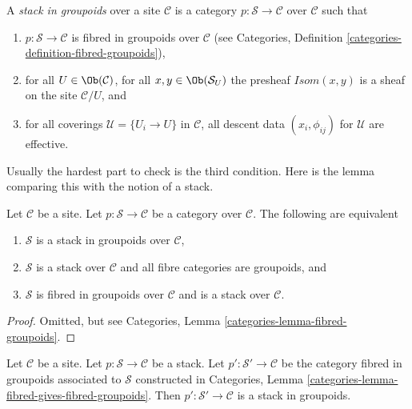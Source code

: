 \begin{definition}
\label{definition-stack-in-groupoids}
A {\it stack in groupoids} over a site $\mathcal{C}$ is a
category $p : \mathcal{S} \to \mathcal{C}$ over $\mathcal{C}$
such that
\begin{enumerate}
\item $p : \mathcal{S} \to \mathcal{C}$ is fibred
in groupoids over $\mathcal{C}$ (see
Categories, Definition \ref{categories-definition-fibred-groupoids}),
\item for all $U \in \Ob(\mathcal{C})$,
for all $x, y\in \Ob(\mathcal{S}_U)$ the presheaf
$\mathit{Isom}(x, y)$ is a sheaf on the site $\mathcal{C}/U$, and
\item for all coverings $\mathcal{U} = \{U_i \to U\}$ in $\mathcal{C}$,
all descent data $(x_i, \phi_{ij})$ for $\mathcal{U}$ are effective.
\end{enumerate}
\end{definition}

\noindent
Usually the hardest part to check is the third condition.
Here is the lemma comparing this with the notion of a stack.

\begin{lemma}
\label{lemma-stack-in-groupoids-stack}
Let $\mathcal{C}$ be a site.
Let $p : \mathcal{S} \to \mathcal{C}$ be a category over $\mathcal{C}$.
The following are equivalent
\begin{enumerate}
\item $\mathcal{S}$ is a stack in groupoids over $\mathcal{C}$,
\item $\mathcal{S}$ is a stack over $\mathcal{C}$ and all
fibre categories are groupoids, and
\item $\mathcal{S}$ is fibred in groupoids over $\mathcal{C}$
and is a stack over $\mathcal{C}$.
\end{enumerate}
\end{lemma}

\begin{proof}
Omitted, but see Categories, Lemma \ref{categories-lemma-fibred-groupoids}.
\end{proof}

\begin{lemma}
\label{lemma-stack-gives-stack-groupoids}
Let $\mathcal{C}$ be a site.
Let $p : \mathcal{S} \to \mathcal{C}$ be a stack.
Let $p' : \mathcal{S}' \to \mathcal{C}$
be the category fibred in groupoids associated to $\mathcal{S}$
constructed in
Categories, Lemma \ref{categories-lemma-fibred-gives-fibred-groupoids}.
Then $p' : \mathcal{S}' \to \mathcal{C}$ is a stack in groupoids.
\end{lemma}

